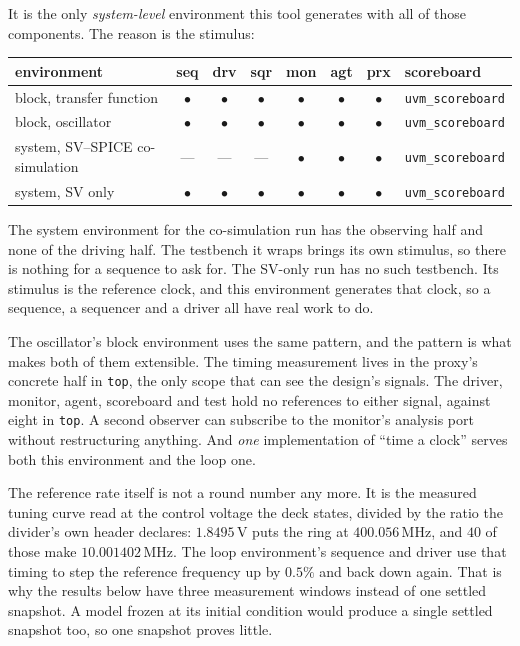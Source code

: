 \documentclass[11pt,a4paper]{article}
\newcommand{\unit}[1]{\,\textrm{#1}}
\begin{document}
It is the only \emph{system-level} environment this tool generates
with all of those components. The reason is the stimulus:

\begin{center}
\begin{tabular}{@{}lccccccl@{}}
\toprule
\textbf{environment} & \textbf{seq} & \textbf{drv} & \textbf{sqr}
  & \textbf{mon} & \textbf{agt} & \textbf{prx} & \textbf{scoreboard} \\
\midrule
block, transfer function & $\bullet$ & $\bullet$ & $\bullet$ & $\bullet$ & $\bullet$ & $\bullet$ & \texttt{uvm\_scoreboard} \\
block, oscillator        & $\bullet$ & $\bullet$ & $\bullet$ & $\bullet$ & $\bullet$ & $\bullet$ & \texttt{uvm\_scoreboard} \\
system, SV--SPICE co-simulation & ---       & ---       & ---       & $\bullet$ & $\bullet$ & $\bullet$ & \texttt{uvm\_scoreboard} \\
system, SV only          & $\bullet$ & $\bullet$ & $\bullet$ & $\bullet$ & $\bullet$ & $\bullet$ & \texttt{uvm\_scoreboard} \\
\bottomrule
\end{tabular}
\end{center}

\noindent The system environment for the co-simulation run has the
observing half and none of the driving half. The testbench it wraps
brings its own stimulus, so there is nothing for a sequence to ask
for. The SV-only run has no such testbench. Its stimulus is the
reference clock, and this environment generates that clock, so a
sequence, a sequencer and a driver all have real work to do.

The oscillator's block environment uses the same pattern, and the
pattern is what makes both of them extensible. The timing measurement
lives in the proxy's concrete half in \texttt{top}, the only scope
that can see the design's signals. The driver, monitor, agent,
scoreboard and test hold no references to either signal, against eight
in \texttt{top}. A second observer can subscribe to the monitor's
analysis port without restructuring anything. And \emph{one}
implementation of ``time a clock'' serves both this environment and
the loop one.

The reference rate itself is not a round number any more. It is the
measured tuning curve read at the control voltage the deck states,
divided by the ratio the divider's own header declares:
$1.8495\unit{V}$ puts the ring at $400.056\unit{MHz}$, and $40$ of
those make $10.001402\unit{MHz}$. The loop environment's sequence and
driver use that timing to step the reference frequency up by $0.5\%$
and back down again. That is why the results below have three
measurement windows instead of one settled snapshot. A model frozen at
its initial condition would produce a single settled snapshot too, so
one snapshot proves little.
\end{document}
